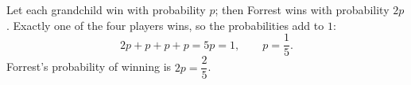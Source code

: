 Let each grandchild win with probability $p$; then Forrest wins with probability $2p$. Exactly one of the four players wins, so the probabilities add to $1$:
\[
2p+p+p+p=5p=1,\qquad p=\dfrac{1}{5} .
\]
Forrest's probability of winning is $2p=\boxed{\dfrac{2}{5}}$.

